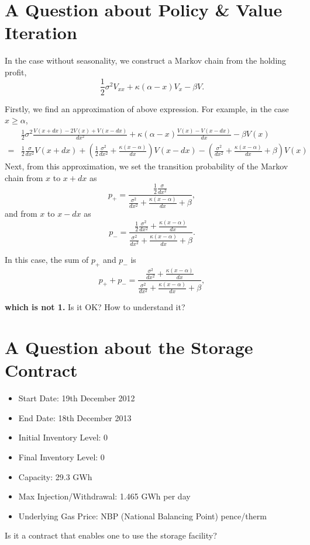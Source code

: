 \documentclass[paper=a4, fontsize=15pt]{scrartcl} %
\numberwithin{equation}{section} %
\numberwithin{figure}{section} %
\numberwithin{table}{section} %
\begin{document}
\newpage
\section{A Question about Policy \& Value Iteration}

In the case without seasonality, we construct a Markov chain from the holding profit, 
\begin{equation*}
  \frac{1}{2}\sigma^2 V_{xx} + \kappa(\alpha - x) V_x - \beta V.
\end{equation*}

Firstly, we find an approximation of above expression. For example, in the case $x\geq \alpha$,
\begin{equation*}
\begin{split}
  &\frac{1}{2}\sigma^2 \frac{V(x+dx) - 2V(x) + V(x-dx)}{dx^2} + \kappa(\alpha - x) \frac{V(x) - V(x-dx)}{dx} - \beta V(x)\\
  = & \frac{1}{2}\frac{\sigma}{dx^2} V(x+dx) + \left(\frac{1}{2}\frac{\sigma^2}{dx^2} + \frac{\kappa(x-\alpha)}{dx}\right)V(x-dx) - \left(\frac{\sigma^2}{dx^2} + \frac{\kappa(x-\alpha)}{dx} + \beta\right)V(x)
\end{split}
\end{equation*}
Next, from this approximation, we set the transition probability of the Markov chain from $x$ to $x+dx$ as 
\begin{equation*}
  p_+ = \frac{\frac{1}{2}\frac{\sigma}{dx^2}}{\frac{\sigma^2}{dx^2} + \frac{\kappa(x-\alpha)}{dx} + \beta},
\end{equation*}
and from $x$ to $x-dx$ as
\begin{equation*}
  p_- = \frac{\frac{1}{2}\frac{\sigma^2}{dx^2} + \frac{\kappa(x-\alpha)}{dx}}{\frac{\sigma^2}{dx^2} + \frac{\kappa(x-\alpha)}{dx} + \beta}.
\end{equation*}

In this case, the sum of $p_+$ and $p_-$ is
\begin{equation*}
  p_+ + p_- =  \frac{\frac{\sigma^2}{dx^2} + \frac{\kappa(x-\alpha)}{dx}}{\frac{\sigma^2}{dx^2} + \frac{\kappa(x-\alpha)}{dx} + \beta},
\end{equation*}


\textbf{which is not 1.} Is it OK? How to understand it?

\section{A Question about the Storage Contract}
\begin{itemize}
  \item Start Date: 19th December 2012
  \item End Date: 18th December 2013
  \item Initial Inventory Level: 0
  \item Final Inventory Level: 0
  \item Capacity: 29.3 GWh
  \item Max Injection/Withdrawal: 1.465 GWh per day
  \item Underlying Gas Price: NBP (National Balancing Point) pence/therm
\end{itemize}



Is it a contract that enables one to use the storage facility?
\end{document}
